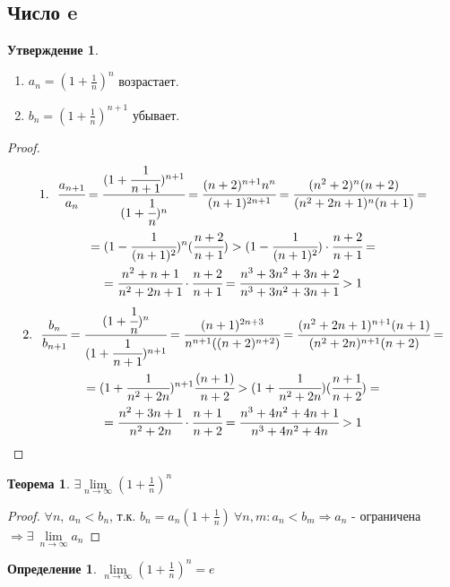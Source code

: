 \documentclass[a4paper, 12pt]{article}
\newcommand\tab[1][.5cm]{\hspace*{#1}}
\newcommand{\lims}{\lim\limits_{n\to \infty}}
\theoremstyle{definition}
\newtheorem*{definition}{Определение}
\newtheorem*{theorem}{Теорема}
\newtheorem*{statement}{Утверждение}
\begin{document}
        \subsection{Число e}
        \begin{statement} \tab
            \begin{enumerate}
                \item $a_n=(1+\frac{1}{n})^n$ возрастает.
                \item $b_n=(1+\frac{1}{n})^{n+1}$ убывает.
            \end{enumerate}
        \end{statement} 
        \begin{proof}
            \begin{multline*}
                1.\ \ \cfrac{a_{n+1}}{a_n}=\cfrac{(1+\cfrac{1}{n+1})^{n+1}}{(1+\cfrac{1}{n})^{n}}=\cfrac{(n+2)^{n+1}n^n}{(n+1)^{2n+1}}=\cfrac{(n^2+2)^n (n+2)}{(n^2+2n+1)^n (n+1)}=\\=(1-\cfrac{1}{(n+1)^2})^n (\cfrac{n+2}{n+1})>(1-\cfrac{1}{(n+1)^2})\cdot \cfrac{n+2}{n+1}=\\=\cfrac{n^2+n+1}{n^2+2n+1}\cdot \cfrac{n+2}{n+1}=\cfrac{n^3+3n^2+3n+2}{n^3+3n^2+3n+1}>1
            \end{multline*}
            \begin{multline*}
                2.\ \ \cfrac{b_n}{b_{n+1}}=\cfrac{(1+\cfrac{1}{n})^{n}}{(1+\cfrac{1}{n+1})^{n+1}}=\cfrac{(n+1)^{2n+3}}{n^{n+1}((n+2)^{n+2})}=\cfrac{(n^2+2n+1)^{n+1}(n+1)}{(n^2+2n)^{n+1}(n+2)}=\\=(1+\cfrac{1}{n^2+2n})^{n+1}\cfrac{(n+1)}{n+2}>(1+\cfrac{1}{n^2+2n})(\cfrac{n+1}{n+2})=\\=\cfrac{n^2+3n+1}{n^2+2n}\cdot \cfrac{n+1}{n+2}=\cfrac{n^3+4n^2+4n+1}{n^3+4n^2+4n}>1
            \end{multline*}
        \end{proof} 
        \begin{theorem}
            $\exists \lims (1+\frac{1}{n})^n$
        \end{theorem} 
        \begin{proof}
            $\forall n,\ a_n<b_n$, т.к. $b_n=a_n(1+\frac{1}{n})\ \forall n,m: a_n<b_m \Rightarrow a_n$ - ограничена $\Rightarrow \exists\ \lims a_n$
        \end{proof} 
        \begin{definition}
            $\lims (1+\frac{1}{n})^n=e$
        \end{definition} 
\end{document}

